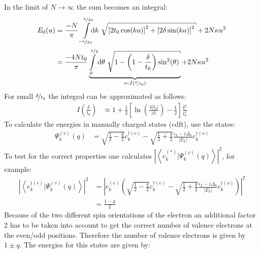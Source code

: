 In the limit of $N \rightarrow \infty$ the sum becomes an integral:
\begin{align}
	E_0(u) &= \frac{-N}{\pi}\int\limits_{\nicefrac{-\pi}{2a}}^{\nicefrac{\pi}{2a}}\hspace*{-0.2cm}\text{d}k\ \sqrt{\left[2t_0\cos(ka)\right]^2+\left[2\delta\sin(ka)\right]^2} + 2N\kappa u^2\\
	&=\frac{-4Nt_0}{\pi}\underbrace{\int\limits_{0}^{\nicefrac{\pi}{2}}\text{d}\theta\ \sqrt{1-\left(1-\frac{\delta}{t_0}\right)\sin^2(\theta)}}_{=:I(\nicefrac{\delta}{t_0})} + 2N\kappa u^2
\end{align}
For small $\nicefrac{\delta}{t_0}$ the integral can be approximated as follows:
\begin{align}
	I\left(\frac{\delta}{t_0}\right) &\approx 1 + \frac{1}{2} \left[\ln\left(\frac{4|t_0|}{|\delta|}\right)-\frac{1}{2}\right]\frac{\delta^2}{t_0^2} 
\end{align}
To calculate the energies in manually charged states (cdft), use the states:
\begin{align}
		\Psi_k^{(v)}(q) &= \sqrt{\frac{1}{2}-\frac{q}{2}}c_k^{\dagger(e)}- \sqrt{\frac{1}{2}+\frac{q}{2}}\frac{\epsilon_k - i \Delta_k}{|E_k|}c_{k}^{\dagger(o)}
\end{align}
To test for the correct properties one calculates $\left|\left\langle c^{(*)}_k|\Psi_k^{(v)}(q)\right\rangle\right|^2$, for example:
\begin{align}
	\left|\left\langle c^{\dagger(e)}_k|\Psi_k^{(v)}(q)\right\rangle\right|^2 &= \left|c_k^{(e)} \left(\sqrt{\frac{1}{2}-\frac{q}{2}}c_k^{\dagger(e)}- \sqrt{\frac{1}{2}+\frac{q}{2}}\frac{\epsilon_k - i \Delta_k}{|E_k|}c_{k}^{\dagger(o)}\right)\right|^2\\
	&= \frac{1-q}{2}
\end{align}
Because of the two different spin orientations of the electron an additional factor 2 has to be taken into account to get the correct number of valence electrons at the even/odd positions. Therefore the number of valence electrons is given by $1 \pm q$. The energies for this states are given by:

